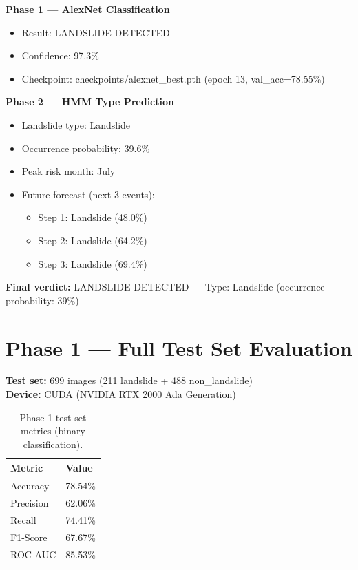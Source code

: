 \documentclass[11pt]{article}
\begin{document}
\vspace{0.3cm}
\noindent \textbf{Phase 1 — AlexNet Classification}
\begin{itemize}[noitemsep]
    \item Result: LANDSLIDE DETECTED
    \item Confidence: 97.3\%
    \item Checkpoint: checkpoints/alexnet\_best.pth (epoch 13, val\_acc=78.55\%)
\end{itemize}

\vspace{0.3cm}
\noindent \textbf{Phase 2 — HMM Type Prediction}
\begin{itemize}[noitemsep]
    \item Landslide type: Landslide
    \item Occurrence probability: 39.6\%
    \item Peak risk month: July
    \item Future forecast (next 3 events):
    \begin{itemize}
        \item Step 1: Landslide (48.0\%)
        \item Step 2: Landslide (64.2\%)
        \item Step 3: Landslide (69.4\%)
    \end{itemize}
\end{itemize}

\noindent \textbf{Final verdict:} LANDSLIDE DETECTED — Type: Landslide (occurrence probability: 39\%)

\section{Phase 1 — Full Test Set Evaluation}

\noindent \textbf{Test set:} 699 images (211 landslide + 488 non\_landslide) \\
\textbf{Device:} CUDA (NVIDIA RTX 2000 Ada Generation)

\vspace{0.3cm}
\begin{table}[h]
    \centering
    \begin{tabular}{@{}ll@{}}
        \toprule
        \textbf{Metric} & \textbf{Value} \\ \midrule
        Accuracy  & 78.54\% \\
        Precision & 62.06\% \\
        Recall    & 74.41\% \\
        F1-Score  & 67.67\% \\
        ROC-AUC   & 85.53\% \\ \bottomrule
    \end{tabular}
    \caption{Phase 1 test set metrics (binary classification).}
\end{table}
\end{document}
